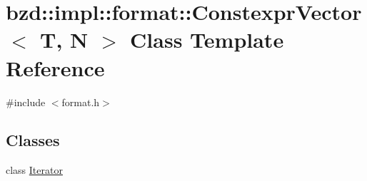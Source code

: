 \hypertarget{classbzd_1_1impl_1_1format_1_1ConstexprVector}{}\section{bzd\+:\+:impl\+:\+:format\+:\+:Constexpr\+Vector$<$ T, N $>$ Class Template Reference}
\label{classbzd_1_1impl_1_1format_1_1ConstexprVector}


{\ttfamily \#include $<$format.\+h$>$}

\subsection*{Classes}
\begin{DoxyCompactItemize}
\item 
class \hyperlink{classbzd_1_1impl_1_1format_1_1ConstexprVector_1_1Iterator}{Iterator}
\end{DoxyCompactItemize}
